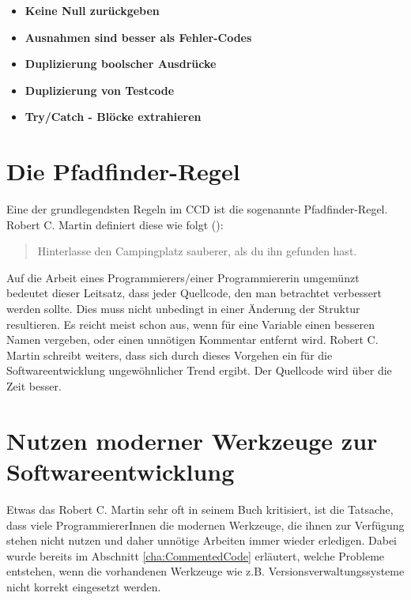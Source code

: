 \begin{itemize}
	\item \textbf{Keine Null zurückgeben}
	\item \textbf{Ausnahmen sind besser als Fehler-Codes}
	\item \textbf{Duplizierung boolscher Ausdrücke}
	\item \textbf{Duplizierung von Testcode}
	\item \textbf{Try/Catch - Blöcke extrahieren}
\end{itemize}

\section{Die Pfadfinder-Regel}
Eine der grundlegendsten Regeln im CCD ist die sogenannte Pfadfinder-Regel. Robert C. Martin definiert diese wie folgt (\cite[Seite 43]{Martin2008}):

\begin{quote}
	Hinterlasse den Campingplatz sauberer, als du ihn gefunden hast.
\end{quote}

\SuperPar Auf die Arbeit eines Programmierers/einer Programmiererin umgemünzt bedeutet dieser Leitsatz, dass jeder Quellcode, den man betrachtet verbessert werden sollte. Dies muss nicht unbedingt in einer Änderung der Struktur resultieren. Es reicht meist schon aus, wenn für eine Variable einen besseren Namen vergeben, oder einen unnötigen Kommentar entfernt wird. Robert C. Martin schreibt weiters, dass sich durch dieses Vorgehen ein für die Softwareentwicklung ungewöhnlicher Trend ergibt. Der Quellcode wird über die Zeit besser. 

\section{Nutzen moderner Werkzeuge zur Softwareentwicklung}
\label{cha:UsefullTools}
Etwas das Robert C. Martin sehr oft in seinem Buch kritisiert, ist die Tatsache, dass viele ProgrammiererInnen die modernen Werkzeuge, die ihnen zur Verfügung stehen nicht nutzen und daher unnötige Arbeiten immer wieder erledigen. Dabei wurde bereits im Abschnitt \ref{cha:CommentedCode} erläutert, welche Probleme entstehen, wenn die vorhandenen Werkzeuge wie z.B. Versionsverwaltungssysteme nicht korrekt eingesetzt werden.

